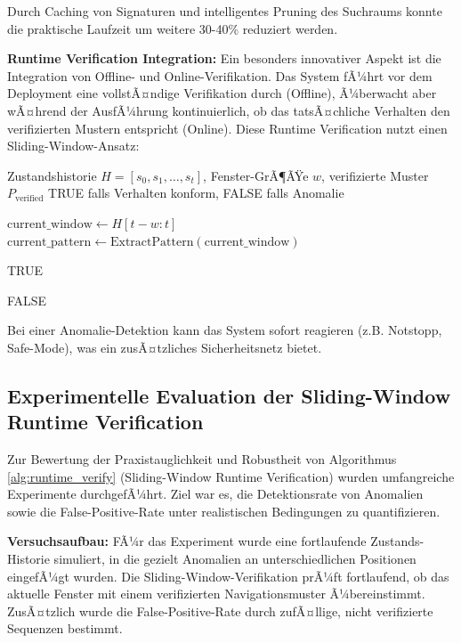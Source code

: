 ﻿\documentclass[a4paper,12pt]{article}
\theoremstyle{definition}
\begin{document}
Durch Caching von Signaturen und intelligentes Pruning des Suchraums konnte die praktische Laufzeit um weitere 30-40\% reduziert werden.

\textbf{Runtime Verification Integration:}
Ein besonders innovativer Aspekt ist die Integration von Offline- und Online-Verifikation. Das System fÃ¼hrt vor dem Deployment eine vollstÃ¤ndige Verifikation durch (Offline), Ã¼berwacht aber wÃ¤hrend der AusfÃ¼hrung kontinuierlich, ob das tatsÃ¤chliche Verhalten den verifizierten Mustern entspricht (Online). Diese Runtime Verification nutzt einen Sliding-Window-Ansatz:

\begin{algorithm}
	\caption{Runtime Verification mit Sliding Window}
	\label{alg:runtime_verify}
	\begin{algorithmic}[1]
		\Require Zustandshistorie $H = [s_0, s_1, \ldots, s_t]$, Fenster-GrÃ¶ÃŸe $w$, verifizierte Muster $P_{\text{verified}}$
		\Ensure TRUE falls Verhalten konform, FALSE falls Anomalie
		
		\State $\text{current\_window} \gets H[t-w:t]$ 
		\State $\text{current\_pattern} \gets \text{ExtractPattern}(\text{current\_window})$
		
		\State \Return TRUE 
		\EndIf
		\EndFor
		
		\State \Return FALSE 
	\end{algorithmic}
\end{algorithm}

Bei einer Anomalie-Detektion kann das System sofort reagieren (z.B. Notstopp, Safe-Mode), was ein zusÃ¤tzliches Sicherheitsnetz bietet.

\subsection{Experimentelle Evaluation der Sliding-Window Runtime Verification}

Zur Bewertung der Praxistauglichkeit und Robustheit von Algorithmus \ref{alg:runtime_verify} (Sliding-Window Runtime Verification) wurden umfangreiche Experimente durchgefÃ¼hrt. Ziel war es, die Detektionsrate von Anomalien sowie die False-Positive-Rate unter realistischen Bedingungen zu quantifizieren.

\textbf{Versuchsaufbau:}
FÃ¼r das Experiment wurde eine fortlaufende Zustands-Historie simuliert, in die gezielt Anomalien an unterschiedlichen Positionen eingefÃ¼gt wurden. Die Sliding-Window-Verifikation prÃ¼ft fortlaufend, ob das aktuelle Fenster mit einem verifizierten Navigationsmuster Ã¼bereinstimmt. ZusÃ¤tzlich wurde die False-Positive-Rate durch zufÃ¤llige, nicht verifizierte Sequenzen bestimmt.
\end{document}
